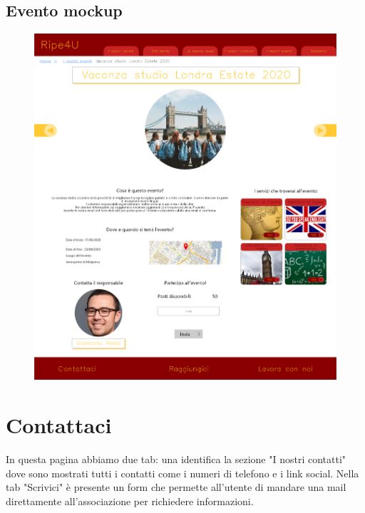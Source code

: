         \subsection{Evento mockup}
        \begin{figure}[H]
            \centering
            \includegraphics[scale=0.18]{resources/images/evento-mockup.png}
        \end{figure}

    \newpage    
    \section{Contattaci}
    In questa pagina abbiamo due tab: una identifica la sezione "I nostri
    contatti" dove sono mostrati tutti i contatti come i numeri di telefono e i
    link social. Nella tab "Scrivici" è presente un form che permette all'utente
    di mandare una mail direttamente all'associazione per richiedere
    informazioni.


